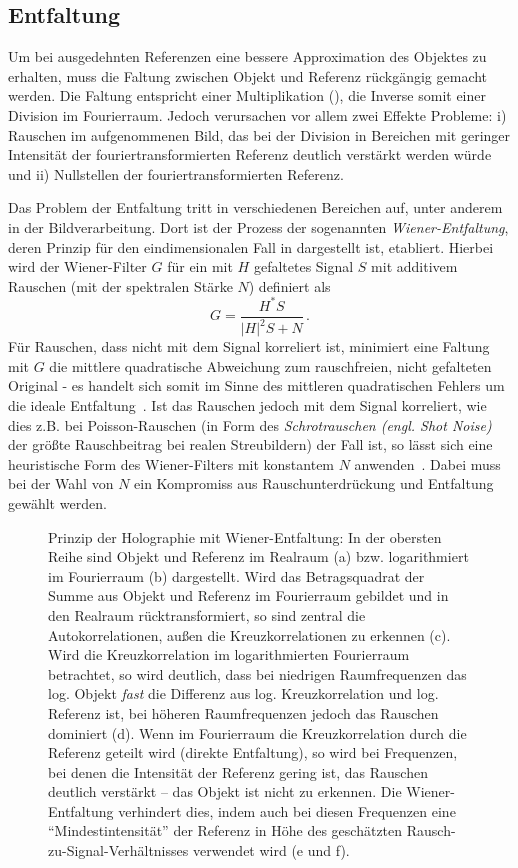 \subsection{Entfaltung}
Um bei ausgedehnten Referenzen eine bessere Approximation des Objektes zu erhalten, muss die Faltung zwischen Objekt und Referenz rückgängig gemacht werden. Die Faltung entspricht einer Multiplikation (), die Inverse somit einer Division im Fourierraum. Jedoch verursachen vor allem zwei Effekte Probleme: i) Rauschen im aufgenommenen Bild, das bei der Division in Bereichen mit geringer Intensität der fouriertransformierten Referenz deutlich verstärkt werden würde und ii) Nullstellen der fouriertransformierten Referenz. 

Das Problem der Entfaltung tritt in verschiedenen Bereichen auf, unter anderem in der Bildverarbeitung.
Dort ist der Prozess der sogenannten \textit{Wiener-Entfaltung}, deren Prinzip für den eindimensionalen Fall in  dargestellt ist, etabliert. Hierbei wird der Wiener-Filter $G$ für ein mit $H$ gefaltetes Signal $S$ mit additivem Rauschen (mit der spektralen Stärke $N$) definiert als
\begin{equation}
	G=\frac{H^* S}{\left|H\right|^2 S+N}\,.
\end{equation}
Für Rauschen, dass nicht mit dem Signal korreliert ist, minimiert eine Faltung mit $G$ die mittlere quadratische Abweichung zum rauschfreien, nicht gefalteten Original - es handelt sich somit im Sinne des mittleren quadratischen Fehlers um die ideale Entfaltung~\cite{castleman1996}. Ist das Rauschen jedoch mit dem Signal korreliert, wie dies z.B. bei Poisson-Rauschen (in Form des \textit{Schrotrauschen (engl. Shot Noise)} der größte Rauschbeitrag bei realen Streubildern) der Fall ist, so lässt sich eine heuristische Form des Wiener-Filters mit konstantem $N$ anwenden~\cite{he2004}. Dabei muss bei der Wahl von $N$ ein Kompromiss aus Rauschunterdrückung und Entfaltung gewählt werden.

\begin{figure}
	\centering
	\caption[Prinzip Enfaltung]{Prinzip der Holographie mit  Wiener-Entfaltung: In der obersten Reihe sind Objekt und Referenz im Realraum (a) bzw. logarithmiert im Fourierraum (b) dargestellt. Wird das Betragsquadrat der Summe aus Objekt und Referenz im Fourierraum gebildet und in den Realraum rücktransformiert, so sind zentral die Autokorrelationen, außen die Kreuzkorrelationen zu erkennen (c). Wird die Kreuzkorrelation im logarithmierten Fourierraum betrachtet, so wird deutlich, dass bei niedrigen Raumfrequenzen das log. Objekt \textit{fast} die Differenz aus log. Kreuzkorrelation und log. Referenz ist, bei höheren Raumfrequenzen jedoch das Rauschen dominiert (d). Wenn im Fourierraum die Kreuzkorrelation durch die Referenz geteilt wird (direkte Entfaltung), so wird bei Frequenzen, bei denen die Intensität der Referenz gering ist, das Rauschen deutlich verstärkt -- das Objekt ist nicht zu erkennen. Die Wiener-Entfaltung verhindert dies, indem auch bei diesen Frequenzen eine "`Mindestintensität"' der Referenz in Höhe des geschätzten Rausch-zu-Signal-Verhältnisses verwendet wird (e und f). }
	\label{fig:wiener}
\end{figure} 

